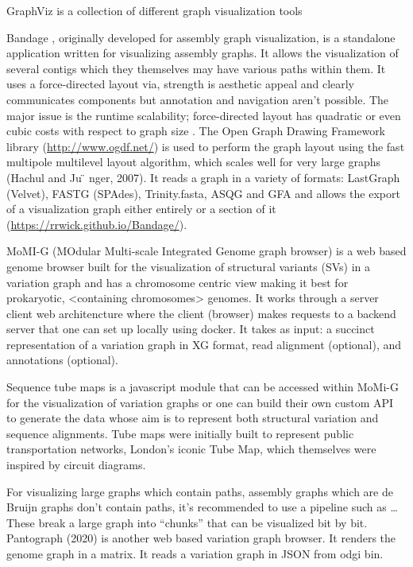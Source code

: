 \documentclass[11pt]{article}
\begin{document}
GraphViz \cite{northOnlineHierarchicalGraph2002,ellsonGraphvizDynagraphStatic2004}
is a collection of different graph visualization tools 

Bandage \cite{wickBandageInteractiveVisualization2015}, originally developed for 
assembly graph visualization, is a standalone application written for
visualizing assembly graphs.
It allows the visualization of several contigs which they themselves may have
various paths within them.
It uses a force-directed layout via, strength is aesthetic appeal and clearly
communicates components but annotation and navigation aren’t possible.
The major issue is the runtime scalability; force-directed layout has quadratic 
or even cubic costs with respect to graph size .
The Open Graph Drawing Framework library (\url{http://www.ogdf.net/}) is used to
perform the graph layout using the fast multipole multilevel layout algorithm, 
which scales well for very large graphs (Hachul and Ju ̈ nger, 2007).
It reads a graph in a variety of formats: LastGraph (Velvet), FASTG (SPAdes), 
Trinity.fasta, ASQG and GFA and allows the export of a visualization graph
either entirely or a section of it (\url{https://rrwick.github.io/Bandage/}).

MoMI-G \cite{yokoyamaMoMIGModularMultiscale2019}
(MOdular Multi-scale Integrated Genome graph browser) 
is a web based genome browser built for the visualization of structural 
variants (SVs) in a variation graph and has a chromosome centric view making
it best for prokaryotic, <containing chromosomes> genomes. 
It works through a server client web architencture where the client (browser)
makes requests to a backend server that one can set up locally using docker.
It takes as input: a succinct representation of a variation graph in XG format,
read alignment (optional), and annotations (optional).

Sequence tube maps \cite{beyerSequenceTubeMaps2019} is a javascript module that
can be accessed within MoMi-G for the visualization of variation graphs or one
can  build their own custom API to generate the data whose aim is to represent
both structural variation and sequence alignments.
Tube maps were initially built to represent public transportation networks,
London’s iconic Tube Map, \cite{cartwrightamBeckRepresentationLondon2012} which 
themselves were inspired by circuit diagrams.

For visualizing large graphs which contain paths, assembly graphs which are de 
Bruijn graphs don’t contain paths, it’s recommended to use a pipeline such as …
These break a large graph into “chunks” that can be visualized bit by bit. 
Pantograph (2020) is another web based variation graph browser. 
It renders the genome graph in a matrix. It reads a variation graph in JSON from
odgi bin.

\end{document}

